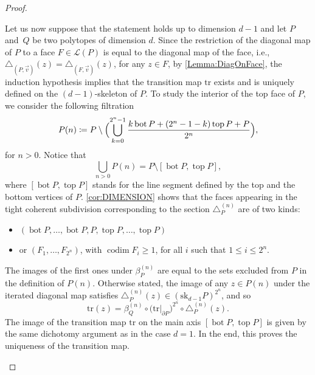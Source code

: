 \documentclass[11pt]{article}
\newcommand{\ie}{i.e.,\xspace}
\numberwithin{equation}{section}\providecommand{\No}{}
\let\mathcal\mathscr
\theoremstyle{plain}
\theoremstyle{definition}
\newcommand{\La}{\mathcal{L}}
\DeclareMathOperator{\tp}{top}
\DeclareMathOperator{\bm}{bot}
\newcommand{\sk}{\mathrm{sk}}
\newcommand{\tr}{\mathrm{tr}}
\DeclareMathOperator{\codim}{codim}
\begin{document}
\begin{proof}
\begin{enumerate}
Let us now suppose that the statement holds up to dimension $d-1$ and let $P$ and~$Q$ be two polytopes of dimension $d$. Since the restriction of the diagonal map of $P$ to a face $F\in \La(P)$ is equal to the diagonal map of the face, \ie $\triangle_{(P, \vec v)}(z)=\triangle_{(F, \vec v)}(z)$, for any $z\in F$, by \cref{Lemma:DiagOnFace}, the
induction hypothesis implies that the transition map $\tr$ exists and is uniquely defined on the $(d-1)$-skeleton of $P$.
To study the interior of the top face of $P$, we consider the following filtration
\[P(n)\coloneqq P\setminus \Bigl(\bigcup_{k=0}^{2^n-1} \frac{k\bm P+(2^n-1-k)\tp P + P}{2^n} \Bigr),\]
for $n> 0$. Notice that
\[\bigcup_{n>0} P(n)=P \setminus [\bm P, \tp P],\]
where $[\bm P, \tp P]$ stands for the line segment defined by the top and the bottom vertices of $P$.
\cref{cor:DIMENSION} shows that the faces appearing in the tight coherent subdivision
corresponding to the section
$\triangle^{(n)}_P$ are of two kinds:
\begin{itemize}
\item
$(\bm P, \ldots, \bm P, P, \tp P, \ldots, \tp P)$
\item
or $(F_1, \ldots, F_{2^n})$, with
$\codim F_i\geq 1$, for all $i$ such that $1\leq i \leq 2^n$. 
\end{itemize}
The images of the first ones under $\beta^{(n)}_P$ are equal to the sets excluded from $P$ in the definition of $P(n)$. Otherwise stated, the image of any $z\in P(n)$ under the iterated diagonal map satisfies $\triangle^{(n)}_P(z)\in \left(\sk_{d-1}P\right)^{2^n}$, and so
\[\tr(z) = \beta^{(n)}_Q\circ\big(\tr|_{\partial P}\big)^{2^n}\circ\triangle^{(n)}_P(z). \]
The image of the transition map $\tr$ on the main axis $[\bm P, \tp P]$ is given by the same dichotomy argument as in the case $d=1$. In the end, this proves the uniqueness of the transition map.


\end{enumerate}
\end{proof}
\end{document}
